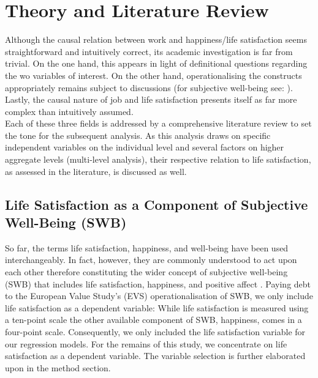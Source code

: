 \documentclass[preprint,12pt,authoryear]{elsarticle}
\begin{document}
	\section{Theory and Literature Review}
	Although the causal relation between work and happiness/life satisfaction seems straightforward and intuitively correct,
	its academic investigation is far from trivial. On the one hand, this appears in light of definitional questions regarding the 
	wo variables of interest. On the other hand, operationalising the constructs appropriately remains subject to discussions
	(for subjective well-being see: \citet{kahneman_developments_2006,layard_measuring_2010}). Lastly, the causal nature of job and life
	satisfaction presents itself as far more complex than intuitively assumed. \\
	Each of these three fields is addressed by a comprehensive literature review to set the tone for the subsequent analysis.
	As this analysis draws on specific independent variables on the individual level and several factors on higher aggregate
	levels (multi-level analysis), their respective relation to life satisfaction, as assessed in the literature, is discussed as well.
	
	\subsection{Life Satisfaction as a Component of Subjective Well-Being (SWB)}
	So far, the terms life satisfaction, happiness, and well-being have been used interchangeably. In fact, however, they
	are commonly understood to act upon each other therefore constituting the wider concept of subjective well-being (SWB)
	that includes life satisfaction, happiness, and positive affect  \citep{bowling_meta-analytic_2010,diener_subjective_1984}. 
	Paying debt to the European Value Study’s (EVS) operationalisation of SWB, we only include life satisfaction as a
	dependent variable: While life satisfaction is measured using a ten-point scale the other available component of SWB,
	happiness, comes in a four-point scale. Consequently, we only included the life satisfaction variable for our regression
	models. For the remains of this study, we concentrate on life satisfaction as a dependent variable. The variable selection
	is further elaborated upon in the method section. 
	
\end{document}
